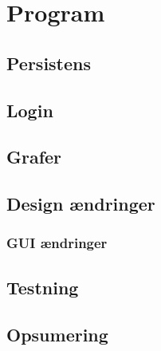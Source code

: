 \chapter{Program}

\section{Persistens}

\section{Login}

\section{Grafer}

\section{Design ændringer}

\subsection{GUI ændringer}

\section{Testning}

\section{Opsumering}
